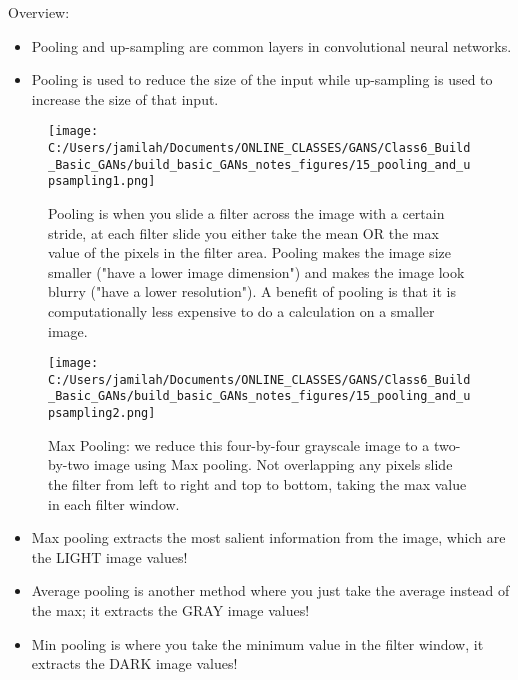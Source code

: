 \documentclass[11pt, onecolumn]{article}
\begin{document}
Overview:
\begin{itemize}
\item Pooling and up-sampling are common layers in convolutional neural networks.
\item Pooling is used to reduce the size of the input while up-sampling is used to increase the size of that input.
\end{itemize}

\begin{figure}[htp]
\begin{center}
\texttt{[image: C:/Users/jamilah/Documents/ONLINE\_CLASSES/GANS/Class6\_Build\_Basic\_GANs/build\_basic\_GANs\_notes\_figures/15\_pooling\_and\_upsampling1.png]}
\end{center}
\caption{Pooling is when you slide a filter across the image with a certain stride, at each filter slide you either take the mean OR the max value of the pixels in the filter area.  Pooling makes the image size smaller ("have a lower image dimension") and makes the image look blurry ("have a lower resolution"). A benefit of pooling is that it is computationally less expensive to do a calculation on a smaller image.}
\label{15_pooling_and_upsampling1}
\end{figure}

\begin{figure}[htp]
\begin{center}
\texttt{[image: C:/Users/jamilah/Documents/ONLINE\_CLASSES/GANS/Class6\_Build\_Basic\_GANs/build\_basic\_GANs\_notes\_figures/15\_pooling\_and\_upsampling2.png]}
\end{center}
\caption{Max Pooling: we reduce this four-by-four grayscale image to a two-by-two image using Max pooling.  Not overlapping any pixels slide the filter from left to right and top to bottom, taking the max value in each filter window.}
\label{15_pooling_and_upsampling2}
\end{figure}

\begin{itemize}
\item Max pooling extracts the most salient information from the image, which are the LIGHT image values!
\item Average pooling is another method where you just take the average instead of the max; it extracts the GRAY image values!
\item Min pooling is where you take the minimum value in the filter window, it extracts the DARK image values!
\end{itemize}
\end{document}
